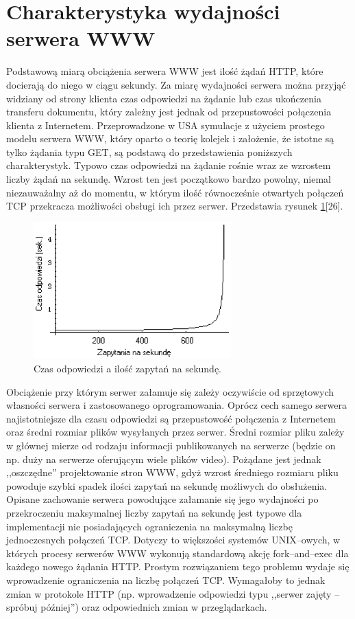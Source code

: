 \section{Charakterystyka wydajności serwera WWW}

Podstawową miarą obciążenia serwera WWW jest ilość żądań HTTP, które docierają do niego w ciągu sekundy. 
Za miarę wydajności serwera można przyjąć widziany od strony klienta czas odpowiedzi na żądanie lub czas 
ukończenia transferu dokumentu, który zależny jest jednak od przepustowości połączenia klienta z Internetem. 
Przeprowadzone w USA symulacje z użyciem prostego modelu serwera WWW, który oparto o teorię kolejek i założenie, 
że istotne są tylko żądania typu GET, są podstawą do przedstawienia poniższych charakterystyk.
Typowo czas odpowiedzi na żądanie rośnie wraz ze wzrostem liczby żądań na sekundę. Wzrost ten jest 
początkowo bardzo powolny, niemal niezauważalny aż do momentu, w którym ilość równocześnie otwartych połączeń 
TCP przekracza możliwości obsługi ich przez serwer. Przedstawia rysunek \ref{zapytania}[26].
\begin{figure}[h]
\centering
\includegraphics[width=3in]{./rysunki/zapytania.eps}
\caption{Czas odpowiedzi a ilość zapytań na sekundę.}
\label{zapytania}
\end{figure}

Obciążenie przy którym serwer załamuje się zależy oczywiście od 
sprzętowych własności serwera i zastosowanego oprogramowania. Oprócz cech samego serwera najistotniejsze dla 
czasu odpowiedzi są przepustowość połączenia z Internetem oraz średni rozmiar plików wysyłanych przez serwer. 
Średni rozmiar pliku zależy w głównej mierze od rodzaju informacji publikowanych na serwerze (będzie on np. duży 
na serwerze oferującym wiele plików video). Pożądane jest jednak ,,oszczędne'' projektowanie stron WWW, gdyż 
wzrost średniego rozmiaru pliku powoduje szybki spadek ilości zapytań na sekundę możliwych do obsłużenia. 
Opisane zachowanie 
serwera powodujące załamanie się jego wydajności po przekroczeniu maksymalnej liczby zapytań na sekundę jest 
typowe dla implementacji nie posiadających ograniczenia na maksymalną liczbę jednoczesnych połączeń TCP. Dotyczy 
to większości systemów UNIX--owych, w których procesy serwerów WWW wykonują standardową akcję fork--and--exec dla 
każdego nowego żądania HTTP. Prostym rozwiązaniem tego problemu wydaje się wprowadzenie ograniczenia na liczbę 
połączeń TCP. Wymagałoby to jednak zmian w protokole HTTP (np. wprowadzenie odpowiedzi typu ,,serwer zajęty --
spróbuj później'') oraz odpowiednich zmian w przeglądarkach.

